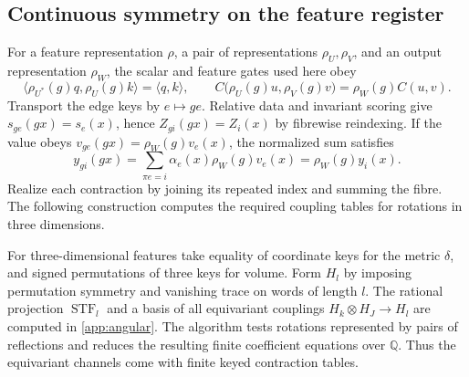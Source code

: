 \documentclass[11pt,a4paper]{article}
\theoremstyle{definition}
\theoremstyle{remark}\newaliascnt{remark}{theorem}
\newcommand{\Q}{\mathbb Q}
\newcommand{\STF}{\operatorname{STF}}
\numberwithin{equation}{section}
\begin{document}
\subsection{Continuous symmetry on the feature register}

For a feature representation \(\rho\), a pair of representations \(\rho_U,\rho_V\), and an output representation \(\rho_W\), the scalar and feature gates used here obey
\[
 \langle \rho_{U^*}(g)q,\rho_U(g)k\rangle=\langle q,k\rangle,\qquad
 C\bigl(\rho_U(g)u,\rho_V(g)v\bigr)=\rho_W(g)C(u,v).
\]
Transport the edge keys by \(e\mapsto ge\). Relative data and invariant scoring give \(s_{ge}(gx)=s_e(x)\), hence \(Z_{gi}(gx)=Z_i(x)\) by fibrewise reindexing. If the value obeys \(v_{ge}(gx)=\rho_W(g)v_e(x)\), the normalized sum satisfies
\[
 y_{gi}(gx)=\sum_{\pi e=i}\alpha_e(x)\rho_W(g)v_e(x)
            =\rho_W(g)y_i(x).
\]
Realize each contraction by joining its repeated index and summing the fibre. The following construction computes the required coupling tables for rotations in three dimensions.

For three-dimensional features take equality of coordinate keys for the metric $\delta$, and signed permutations of three keys for volume. Form $H_l$ by imposing permutation symmetry and vanishing trace on words of length $l$. The rational projection $\STF_l$ and a basis of all equivariant couplings $H_k\otimes H_J\to H_l$ are computed in \cref{app:angular}. The algorithm tests rotations represented by pairs of reflections and reduces the resulting finite coefficient equations over $\Q$. Thus the equivariant channels come with finite keyed contraction tables.
\end{document}
